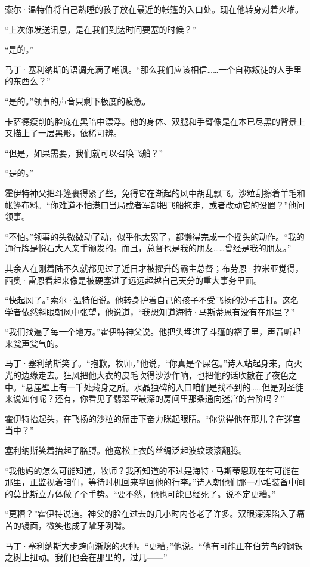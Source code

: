 \documentclass[AutoFakeBold=true]{book}
\begin{document}
索尔·温特伯将自己熟睡的孩子放在最近的帐篷的入口处。现在他转身对着火堆。

``上次你发送讯息，是在我们到达时间要塞的时候？''

``是的。''

马丁·塞利纳斯的语调充满了嘲讽。``那么我们应该相信……一个自称叛徒的人手里的东西么？''

``是的。''领事的声音只剩下极度的疲惫。

卡萨德瘦削的脸庞在黑暗中漂浮。他的身体、双腿和手臂像是在本已尽黑的背景上又描上了一层黑影，依稀可辨。

``但是，如果需要，我们就可以召唤飞船？''

``是的。''

霍伊特神父把斗篷裹得紧了些，免得它在渐起的风中胡乱飘飞。沙粒刮擦着羊毛和帐篷布料。``你难道不怕港口当局或者军部把飞船拖走，或者改动它的设置？''他问领事。

``不怕。''领事的头微微动了动，似乎他太累了，都懒得完成一个摇头的动作。``我的通行牌是悦石大人亲手颁发的。而且，总督也是我的朋友……曾经是我的朋友。''

其余人在刚着陆不久就都见过了近日才被擢升的霸主总督；布劳恩·拉米亚觉得，西奥·雷恩看起来像是被硬塞进了远远超越自己天分的重大事务里面。

``快起风了。''索尔·温特伯说。他转身护着自己的孩子不受飞扬的沙子击打。这名学者依然斜眼朝风中张望，他说道，``我想知道海特·马斯蒂恩有没有在那里？''

``我们找遍了每一个地方。''霍伊特神父说。他把头埋进了斗篷的褶子里，声音听起来瓮声瓮气的。

马丁·塞利纳斯笑了。``抱歉，牧师，''他说，``你真是个屎包。''诗人站起身来，向火光的边缘走去。狂风把他大衣的皮毛吹得沙沙作响，也把他的话吹散在了夜色之中。``悬崖壁上有一千处藏身之所。水晶独碑的入口咱们是找不到的……但是对圣徒来说如何呢？还有，你看见了翡翠茔最深的房间里那条通向迷宫的台阶吗？''

霍伊特抬起头，在飞扬的沙粒的痛击下奋力眯起眼睛。``你觉得他在那儿？在迷宫当中？''

塞利纳斯笑着抬起了胳膊。他宽松上衣的丝绸泛起波纹滚滚翻腾。

``我他妈的怎么可能知道，牧师？我所知道的不过是海特·马斯蒂恩现在有可能在那里，正监视着咱们，等待时机回来拿回他的行李。''诗人朝他们那一小堆装备中间的莫比斯立方体做了个手势。``要不然，他也可能已经死了。说不定更糟。''

``更糟？''霍伊特说道。神父的脸在过去的几小时内苍老了许多。双眼深深陷入了痛苦的镜面，微笑也成了龇牙咧嘴。

马丁·塞利纳斯大步跨向渐熄的火种。``更糟，''他说。``他有可能正在伯劳鸟的钢铁之树上扭动。我们也会在那里的，过几——''
\end{document}
